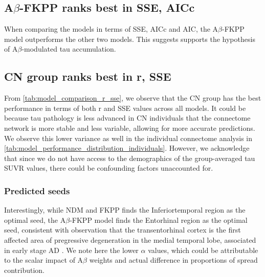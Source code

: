\subsection{A$\beta$-FKPP ranks best in SSE, AICc}
When comparing the models in terms of SSE, AICc and AIC, the A$\beta$-FKPP model outperforms the other two models. This suggests supports the hypothesis of A$\beta$-modulated tau accumulation.

\subsection{CN group ranks best in r, SSE}
From \autoref{tab:model_comparison_r_sse}, we observe that the CN group has the best performance in terms of both r and SSE values across all models. It could be because tau pathology is less advanced in CN individuals that the connectome network is more stable and less variable, allowing for more accurate predictions. We observe this lower variance as well in the individual connectome analysis in \autoref{tab:model_performance_distribution_individuals}. However, we acknowledge that since we do not have access to the demographics of the group-averaged tau SUVR values, there could be confounding factors unaccounted for.


\subsubsection{Predicted seeds}
Interestingly, while NDM and FKPP finds the Inferiortemporal region as the optimal seed, the A$\beta$-FKPP model finds the Entorhinal region as the optimal seed, consistent with observation that the transentorhinal cortex is the first affected area of pregressive degeneration in the medial temporal lobe, associated in early stage AD \citep{dominguez2018three}. We note here the lower $\alpha$ values, which could be attributable to the scalar impact of A$\beta$ weights and actual difference in proportions of spread contribution.



